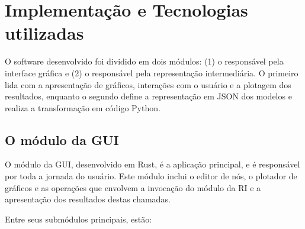 \documentclass[
	12pt,				%
	openright,			%
	oneside,			%
	a4paper,			%
	main=brazil,
	english,			%
	]{ufsj-abntex2}
\begin{document}
\section{Implementação e Tecnologias utilizadas}
\label{sec:tecnologias}

O software desenvolvido foi dividido em dois módulos: (1) o responsável pela interface gráfica e (2) o responsável pela representação intermediária. O primeiro lida com a apresentação de gráficos, interações com o usuário e a plotagem dos resultados, enquanto o segundo define a representação em JSON dos modelos e realiza a transformação em código Python.

\subsection{O módulo da GUI}
\label{sub:gui}

O módulo da GUI, desenvolvido em Rust, é a aplicação principal, e é responsável por toda a jornada do usuário. Este módulo inclui o editor de nós, o plotador de gráficos e as operações que envolvem a invocação do módulo da RI e a apresentação dos resultados destas chamadas.

Entre seus submódulos principais, estão:
\end{document}
